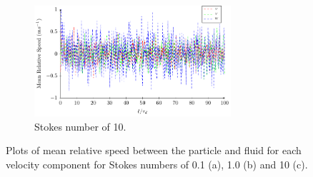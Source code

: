 \documentclass[../Interim_Report_Master]{subfiles}
\begin{document}
\begin{figure}\ContinuedFloat
	\centering
	\begin{subfigure}[t]{\textwidth}
		\centering
		\includegraphics[width=0.8\textwidth]{./Diagrams/Statistical_Verification_Test/stk_10/Statistical_Verification_Test_Velocity_stk_10.pdf}
		\caption{Stokes number of 10.}
		\label{rel_vel_stk_10}
	\end{subfigure}
\caption{Plots of mean relative speed between the particle and fluid for each velocity component for Stokes numbers of 0.1 (a), 1.0 (b) and 10 (c).}
\label{rel_vel}
\end{figure}
\end{document}
